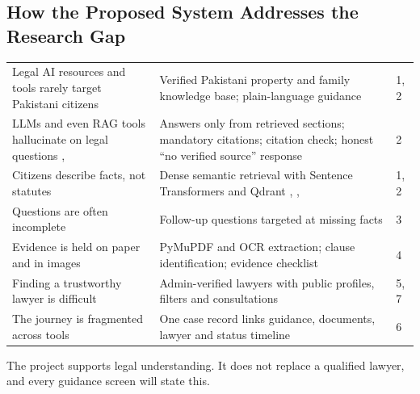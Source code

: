 \subsection{How the Proposed System Addresses the Research Gap}

\begin{center}
\begin{tabular}{|L{5.11cm}|L{7.66cm}|L{1.70cm}|}
\hline\headrow {} &  &  \\ \hline
Legal AI resources and tools rarely target Pakistani citizens & Verified Pakistani property and family knowledge base; plain-language guidance & 1, 2 \\ \hline
LLMs and even RAG tools hallucinate on legal questions \cite{r8}, \cite{r9} & Answers only from retrieved sections; mandatory citations; citation check; honest ``no verified source'' response & 2 \\ \hline
Citizens describe facts, not statutes & Dense semantic retrieval with Sentence Transformers and Qdrant \cite{r12}, \cite{r13}, \cite{r20} & 1, 2 \\ \hline
Questions are often incomplete & Follow-up questions targeted at missing facts & 3 \\ \hline
Evidence is held on paper and in images & PyMuPDF and OCR extraction; clause identification; evidence checklist & 4 \\ \hline
Finding a trustworthy lawyer is difficult & Admin-verified lawyers with public profiles, filters and consultations & 5, 7 \\ \hline
The journey is fragmented across tools & One case record links guidance, documents, lawyer and status timeline & 6 \\ \hline
\end{tabular}
\end{center}

The project supports legal understanding. It does not replace a qualified lawyer, and every guidance screen will state this.
